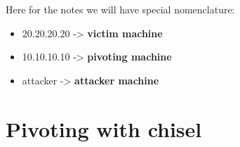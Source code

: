 \documentclass{assets/ipesethesis}
\providecommand{\tightlist}{%
  \setlength{\itemsep}{0pt}\setlength{\parskip}{0pt}}
\begin{document}
Here for the notes we will have special nomenclature:

\begin{itemize}
\tightlist
\item
  20.20.20.20 -\textgreater{} \textbf{victim machine}\\
\item
  10.10.10.10 -\textgreater{} \textbf{pivoting machine}\\
\item
  attacker -\textgreater{} \textbf{attacker machine}
\end{itemize}

\hypertarget{pivoting-with-chisel}{%
\section*{Pivoting with chisel}\label{pivoting-with-chisel}}
\end{document}
